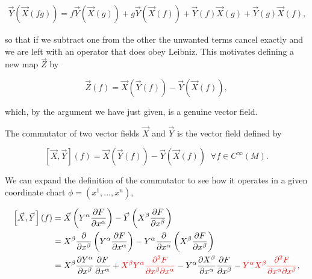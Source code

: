        \begin{align*}
            \Vec{Y}\left(\Vec{X}(fg)\right) = f \Vec{Y}\left(\Vec{X}(g)\right) + g\Vec{Y}\left(\Vec{X}(f)\right) + \Vec{Y}(f)\Vec{X}(g) + \Vec{Y}(g)\Vec{X}(f),
        \end{align*}

        so that if we subtract one from the other the unwanted terms cancel exactly and we are left with an operator that does obey Leibniz. This motivates defining a new map $\Vec{Z}$ by

        \begin{equation}
            \Vec{Z}(f) = \Vec{X}\left(\Vec{Y}(f)\right) - \Vec{Y}\left(\Vec{X}(f)\right),
        \end{equation}

        which, by the argument we have just given, is a genuine vector field.

        \begin{myDef}
            The commutator of two vector fields $\Vec{X}$ and $\Vec{Y}$ is the vector field defined by

            \begin{equation}
                \left[\Vec{X},\Vec{Y}\right](f) = \Vec{X}\left(\Vec{Y}(f)\right) - \Vec{Y}\left(\Vec{X}(f)\right)\;\; \forall f \in C^{\infty}(M).
            \end{equation}
        \end{myDef}

        We can expand the definition of the commutator to see how it operates in a given coordinate chart $\phi = (x^1,...,x^n)$,

        \begin{align*}
            \left[\Vec{X},\Vec{Y}\right](f) &= \Vec{X}\left(Y^{\alpha}\frac{\partial F}{\partial x^{\alpha}}\right) - \Vec{Y}\left(X^{\beta}\frac{\partial F}{\partial x^{\beta}}\right)\\
            &= X^{\beta}\frac{\partial}{\partial x^{\beta}}\left(Y^{\alpha}\frac{\partial F}{\partial x^{\alpha}}\right) - Y^{\alpha}\frac{\partial}{\partial x^{\alpha}}\left(X^{\beta}\frac{\partial F}{\partial x^{\beta}} \right)\\
            &= X^{\beta}\frac{\partial Y^{\alpha}}{\partial x^{\beta}}\frac{\partial F}{\partial x^{\alpha}} + {\color{red}X^{\beta}Y^{\alpha}\frac{\partial^2 F}{\partial x^{\beta}\partial x^{\alpha}}} - Y^{\alpha}\frac{\partial X^{\beta}}{\partial x^{\alpha}}\frac{\partial F}{\partial x^{\beta}} - {\color{red}Y^{\alpha}X^{\beta}\frac{\partial^2 F}{\partial x^{\alpha}\partial x^{\beta}}},
        \end{align*}

